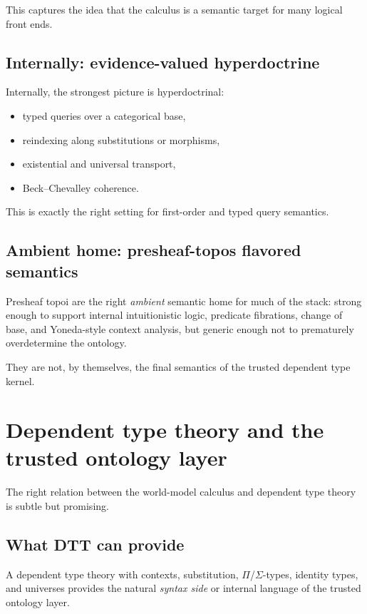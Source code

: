\documentclass[11pt]{article}
\begin{document}
This captures the idea that the calculus is a semantic target for many logical
front ends.

\subsection{Internally: evidence-valued hyperdoctrine}

Internally, the strongest picture is hyperdoctrinal:
\begin{itemize}
  \item typed queries over a categorical base,
  \item reindexing along substitutions or morphisms,
  \item existential and universal transport,
  \item Beck--Chevalley coherence.
\end{itemize}

This is exactly the right setting for first-order and typed query semantics.

\subsection{Ambient home: presheaf-topos flavored semantics}

Presheaf topoi are the right \emph{ambient} semantic home for much of the stack:
strong enough to support internal intuitionistic logic, predicate fibrations,
change of base, and Yoneda-style context analysis, but generic enough not to
prematurely overdetermine the ontology.

They are not, by themselves, the final semantics of the trusted dependent type
kernel.

\section{Dependent type theory and the trusted ontology layer}

The right relation between the world-model calculus and dependent type theory is
subtle but promising.

\subsection{What DTT can provide}

A dependent type theory with contexts, substitution, $\Pi$/$\Sigma$-types,
identity types, and universes provides the natural \emph{syntax side} or
internal language of the trusted ontology layer.
\end{document}
